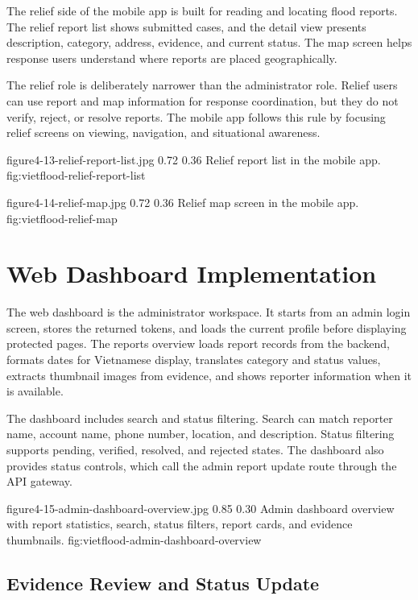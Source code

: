 The relief side of the mobile app is built for reading and locating flood reports. The relief report list shows submitted cases, and the detail view presents description, category, address, evidence, and current status. The map screen helps response users understand where reports are placed geographically.

The relief role is deliberately narrower than the administrator role. Relief users can use report and map information for response coordination, but they do not verify, reject, or resolve reports. The mobile app follows this rule by focusing relief screens on viewing, navigation, and situational awareness.

\vfplaceholderfigure
    {figure4-13-relief-report-list.jpg}
    {0.72}
    {0.36}
    {Relief report list in the mobile app.}
    {fig:vietflood-relief-report-list}

\vfplaceholderfigure
    {figure4-14-relief-map.jpg}
    {0.72}
    {0.36}
    {Relief map screen in the mobile app.}
    {fig:vietflood-relief-map}

\section{Web Dashboard Implementation}

The web dashboard is the administrator workspace. It starts from an admin login screen, stores the returned tokens, and loads the current profile before displaying protected pages. The reports overview loads report records from the backend, formats dates for Vietnamese display, translates category and status values, extracts thumbnail images from evidence, and shows reporter information when it is available.

The dashboard includes search and status filtering. Search can match reporter name, account name, phone number, location, and description. Status filtering supports pending, verified, resolved, and rejected states. The dashboard also provides status controls, which call the admin report update route through the API gateway.

\vfplaceholderfigure
    {figure4-15-admin-dashboard-overview.jpg}
    {0.85}
    {0.30}
    {Admin dashboard overview with report statistics, search, status filters, report cards, and evidence thumbnails.}
    {fig:vietflood-admin-dashboard-overview}

\subsection{Evidence Review and Status Update}

